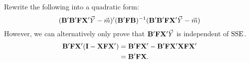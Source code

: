 \begin{Theorem}{}{}
\begin{enumerate}[(1)]
              Rewrite the following into a quadratic form:
              \[ (\mathbf{B}'\mathbf{B}'\mathbf{F}\mathbf{X}'\vec{Y}-\vec{m})'(\mathbf{B}'\mathbf{F}\mathbf{B})^{-1}(\mathbf{B}'\mathbf{B}'\mathbf{F}\mathbf{X}'\vec{Y}-\vec{m}) \]
              However, we can alternatively only prove that $ \mathbf{B}'\mathbf{F}\mathbf{X}'\vec{Y} $ is independent of $ \text{SSE} $.
              \begin{align*}
                  \mathbf{B}'\mathbf{F}\mathbf{X}'(\mathbf{I}-\mathbf{X}\mathbf{F}\mathbf{X}')
                   & =\mathbf{B}'\mathbf{F}\mathbf{X}'-\mathbf{B}'\mathbf{F}\mathbf{X}'\mathbf{X}\mathbf{F}\mathbf{X}' \\
                   & =\mathbf{B}'\mathbf{F}\mathbf{X}.
              \end{align*}
    \end{enumerate}
\end{Theorem}
